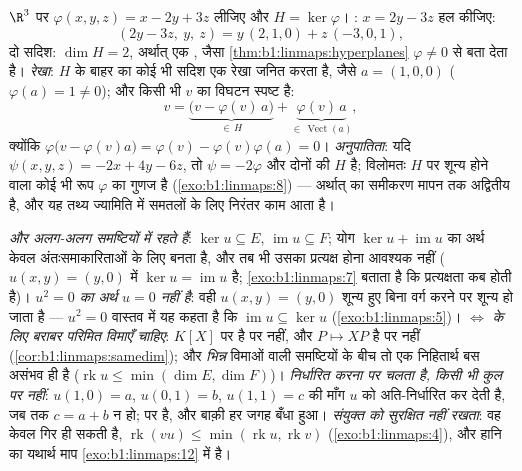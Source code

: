 \begin{example}[एक अधिसमतल, तीन तरीक़ों से]
\label{ex:b1:linmaps:hyperplanerun}
$\R^3$ पर $\varphi(x, y, z) = x - 2y + 3z$ लीजिए और $H = \ker\varphi$।
\emph{}: $x = 2y - 3z$ हल कीजिए:
\[
(2y - 3z,\ y,\ z) = y\,(2, 1, 0) + z\,(-3, 0, 1),
\]
दो  सदिश: $\dim H = 2$, अर्थात् एक , जैसा
\cref{thm:b1:linmaps:hyperplanes} $\varphi \neq 0$ से बता देता है।
\emph{ रेखा}: $H$ के बाहर का कोई भी सदिश एक रेखा जनित करता है, जैसे $a =
(1, 0, 0)$ ($\varphi(a) = 1 \neq 0$); और किसी भी $v$ का विघटन स्पष्ट है:
\[
v = \underbrace{\bigl(v - \varphi(v)\,a\bigr)}_{\in\,H}
+ \underbrace{\varphi(v)\,a}_{\in\,\operatorname{Vect}(a)},
\]
क्योंकि $\varphi\bigl(v - \varphi(v)a\bigr) = \varphi(v) -
\varphi(v)\varphi(a) = 0$। \emph{अनुपातिता}: यदि $\psi(x,y,z) = -2x + 4y -
6z$, तो $\psi = -2\varphi$ और दोनों की  $H$ है; विलोमतः $H$ पर शून्य
होने वाला कोई भी रूप $\varphi$ का गुणज है (\cref{exo:b1:linmaps:8}) ---
अर्थात्  का समीकरण मापन तक अद्वितीय है, और यह तथ्य ज्यामिति में
समतलों के लिए निरंतर काम आता है।
\end{example}

\begin{remark}[सामान्य भूलें]
\label{rem:b1:linmaps:pitfalls}
\emph{ और  अलग-अलग समष्टियों में रहते हैं}: $\ker u \subseteq
E$, $\operatorname{im} u \subseteq F$; योग $\ker u + \operatorname{im} u$ का
अर्थ केवल अंतःसमाकारिताओं के लिए बनता है, और तब भी उसका प्रत्यक्ष होना
आवश्यक नहीं ($u(x, y) = (y, 0)$ में $\ker u = \operatorname{im} u$ है;
\cref{exo:b1:linmaps:7} बताता है कि प्रत्यक्षता कब होती है)। \emph{$u^2 = 0$
का अर्थ $u = 0$ नहीं है}: वही $u(x,y) = (y, 0)$ शून्य हुए बिना वर्ग करने पर
शून्य हो जाता है --- $u^2 = 0$ वास्तव में यह कहता है कि $\operatorname{im} u
\subseteq \ker u$ (\cref{exo:b1:linmaps:5})। \emph{ $\iff$  के
लिए बराबर परिमित विमाएँ चाहिए}: $K[X]$ पर   है पर  नहीं, और
$P \mapsto XP$  है पर  नहीं (\cref{cor:b1:linmaps:samedim}); और
\emph{भिन्न} विमाओं वाली समष्टियों के बीच तो एक निहितार्थ बस असंभव ही है
($\operatorname{rk} u \leq \min(\dim E, \dim F)$)। \emph{ निर्धारित
करना  पर चलता है, किसी भी कुल पर नहीं}: $u(1, 0) = a$, $u(0, 1) = b$,
$u(1, 1) = c$ की माँग $u$ को अति-निर्धारित कर देती है, जब तक $c = a + b$ न
हो;   पर  है, और बाक़ी हर जगह बँधा हुआ।
\emph{संयुक्त   को सुरक्षित नहीं रखता}: वह केवल गिर ही सकती
है, $\operatorname{rk}(vu) \leq \min(\operatorname{rk} u, \operatorname{rk}
v)$ (\cref{exo:b1:linmaps:4}), और हानि का यथार्थ माप
\cref{exo:b1:linmaps:12} में है।
\end{remark}

